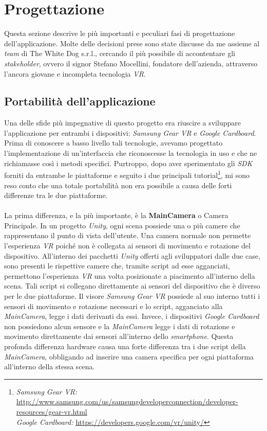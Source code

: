\section{Progettazione}

Questa sezione descrive le più importanti e peculiari fasi di progettazione dell'applicazione. Molte delle decisioni prese sono state discusse da me assieme al \textit{team} di The White Dog s.r.l., cercando il più possibile di accontentare gli \textit{stakeholder}\hyperlink{sh}{}, ovvero il signor Stefano Mocellini, fondatore dell'azienda, attraverso l'ancora giovane e incompleta tecnologia \textit{VR}.

\subsection{Portabilità dell'applicazione}

Una delle sfide più impegnative di questo progetto era riuscire a sviluppare l'applicazione per entrambi i dispositivi: \textit{Samsung Gear VR} e \textit{Google Cardboard}. Prima di conoscere a basso livello tali tecnologie, avevamo progettato l'implementazione di un'interfaccia che riconoscesse la tecnologia in uso e che ne richiamasse così i metodi specifici. Purtroppo, dopo aver sperimentato gli \textit{SDK} forniti da entrambe le piattaforme e seguito i due principali tutorial\footnote[1]{\textit{Samsung Gear VR:} \url{http://www.samsung.com/us/samsungdeveloperconnection/developer-resources/gear-vr.html} \\ \textit{Google Cardboard:} \url{https://developers.google.com/vr/unity/}}, mi sono reso conto che una totale portabilità non era possibile a causa delle forti differenze tra le due piattaforme. \\ \\
La prima differenza, e la più importante, è la \textbf{MainCamera} o Camera Principale. In un progetto \textit{Unity}, ogni scena possiede una o più camere che rappresentano il punto di vista dell'utente. Una camera normale non permette l'esperienza \textit{VR} poiché non è collegata ai sensori di movimento e rotazione del dispositivo. All'interno dei pacchetti \textit{Unity} offerti agli sviluppatori dalle due case, sono presenti le rispettive camere che, tramite script ad esse agganciati, permettono l'esperienza \textit{VR} una volta posizionate a piacimento all'interno della scena. Tali script si collegano direttamente ai sensori del dispositivo che è diverso per le due piattaforme. Il visore \textit{Samsung Gear VR} possiede al suo interno tutti i sensori di movimento e rotazione necessari e lo script, agganciato alla \textit{MainCamera}, legge i dati derivanti da essi. Invece, i dispositivi \textit{Google Cardboard} non possiedono alcun sensore e la \textit{MainCamera} legge i dati di rotazione e movimento direttamente dai sensori all'interno dello \textit{smartphone}. Questa profonda differenza hardware causa una forte differenza tra i due script della \textit{MainCamera}, obbligando ad inserire una camera specifica per ogni piattaforma all'interno della stessa scena.

